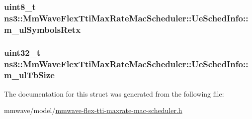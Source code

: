 \subsubsection[{\texorpdfstring{m\+\_\+ul\+Symbols\+Retx}{m_ulSymbolsRetx}}]{\setlength{\rightskip}{0pt plus 5cm}uint8\+\_\+t ns3\+::\+Mm\+Wave\+Flex\+Tti\+Max\+Rate\+Mac\+Scheduler\+::\+Ue\+Sched\+Info\+::m\+\_\+ul\+Symbols\+Retx}\hypertarget{structns3_1_1MmWaveFlexTtiMaxRateMacScheduler_1_1UeSchedInfo_aec467be56213d3be92a58d9f1bd7092b}{}\label{structns3_1_1MmWaveFlexTtiMaxRateMacScheduler_1_1UeSchedInfo_aec467be56213d3be92a58d9f1bd7092b}
\subsubsection[{\texorpdfstring{m\+\_\+ul\+Tb\+Size}{m_ulTbSize}}]{\setlength{\rightskip}{0pt plus 5cm}uint32\+\_\+t ns3\+::\+Mm\+Wave\+Flex\+Tti\+Max\+Rate\+Mac\+Scheduler\+::\+Ue\+Sched\+Info\+::m\+\_\+ul\+Tb\+Size}\hypertarget{structns3_1_1MmWaveFlexTtiMaxRateMacScheduler_1_1UeSchedInfo_a37c088d56a107cc7eb03654c61186384}{}\label{structns3_1_1MmWaveFlexTtiMaxRateMacScheduler_1_1UeSchedInfo_a37c088d56a107cc7eb03654c61186384}


The documentation for this struct was generated from the following file\+:\begin{DoxyCompactItemize}
\item 
mmwave/model/\hyperlink{mmwave-flex-tti-maxrate-mac-scheduler_8h}{mmwave-\/flex-\/tti-\/maxrate-\/mac-\/scheduler.\+h}\end{DoxyCompactItemize}
